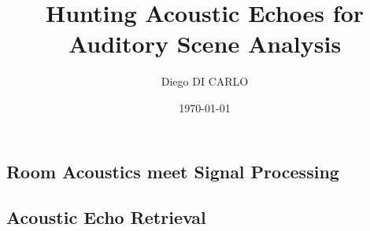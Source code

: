 \documentclass[pdftex,dvipsnames]{dissertation}
\title{Hunting Acoustic Echoes for Auditory Scene Analysis}
\author{Diego DI CARLO}
\date{\today}
\begin{document}
\frontmatter{}





\blankpage

\begin{otherlanguage}{french}

\end{otherlanguage}
\blankpage

\begin{otherlanguage}{french}

\end{otherlanguage}
\blankpage



\doparttoc[n]
\tableofcontents*{}
\blankpage


\blankpage



\setcounter{mtc}{9}
\mainmatter{}



\begin{fullwidth}
    \part{Room Acoustics meet Signal Processing}\label{pt:background}
\end{fullwidth}
\parttoc[n]



\blankpage

\begin{fullwidth}
\part{Acoustic Echo Retrieval}\label{pt:estimation}
\end{fullwidth}
\parttoc[n]
\blankpage


\blankpage



\blankpage


\end{document}
